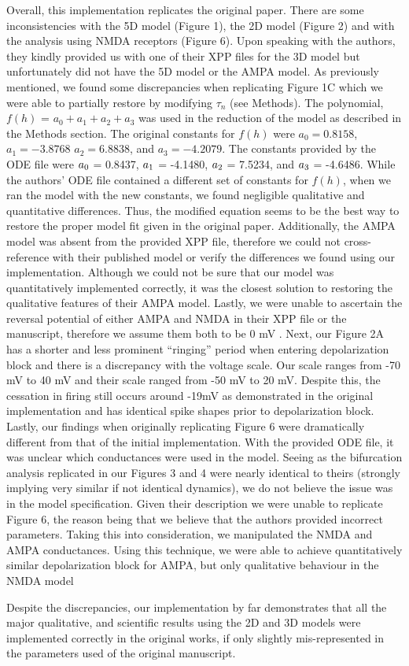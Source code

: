 Overall, this implementation replicates the original paper. There are some inconsistencies with the 5D model (Figure 1), the 2D model (Figure 2) and with the analysis using NMDA receptors (Figure 6). Upon speaking with the authors, they kindly provided us with one of their XPP files for the 3D model but unfortunately did not have the 5D model or the AMPA model. As previously mentioned, we found some discrepancies when replicating Figure 1C which we were able to partially restore by modifying $\tau_n$ (see Methods). The polynomial, $f(h)$ = $a_0 + a_1 + a_2 + a_3$ was used in the reduction of the model as described in the Methods section.  The original constants for $f(h)$ were $a_0 =0.8158$, $a_1= −3.8768$ $a_2 = 6.8838$, and $a_3 = −4.2079$. The constants provided by the ODE file were $a\textsubscript{0}$ = 0.8437, $a\textsubscript{1}$ = -4.1480, $a\textsubscript{2}$ = 7.5234, and $a\textsubscript{3}$ = -4.6486. While the authors’ ODE file contained a different set of constants for $f(h)$, when we ran the model with the new constants, we found negligible qualitative and quantitative differences. Thus, the modified equation seems to be the best way to restore the proper model fit given in the original paper. Additionally, the AMPA model was absent from the provided XPP file, therefore we could not cross-reference with their published model or verify the differences we found using our implementation. Although we could not be sure that our model was quantitatively implemented correctly, it was the closest solution to restoring the qualitative features of their AMPA model. Lastly, we were unable to ascertain the reversal potential of either AMPA and NMDA in their XPP file or the manuscript, therefore we assume them both to be 0 mV \cite{neuroscience_2001}. Next, our Figure 2A has a shorter and less prominent ``ringing'' period when entering depolarization block and there is a discrepancy with the voltage scale. Our scale ranges from -70 mV to 40 mV and their scale ranged from -50 mV to 20 mV.  Despite this, the cessation in firing still occurs around -19mV as demonstrated in the original implementation and has identical spike shapes prior to depolarization block. Lastly, our findings when originally replicating Figure 6 were dramatically different from that of the initial implementation. With the provided ODE file, it was unclear which conductances were used in the model. Seeing as the bifurcation analysis replicated in our Figures 3 and 4 were nearly identical to theirs (strongly implying very similar if not identical dynamics), we do not believe the issue was in the model specification. Given their description we were unable to replicate Figure 6, the reason being that we believe that the authors provided incorrect parameters. Taking this into consideration, we manipulated the NMDA and AMPA conductances. Using this technique, we were able to achieve quantitatively similar depolarization block for AMPA, but only qualitative behaviour in the NMDA model

Despite the discrepancies, our implementation by far demonstrates that all the major qualitative, and scientific results using the 2D and 3D models were implemented correctly in the original works, if only slightly mis-represented in the parameters used of the original manuscript.


